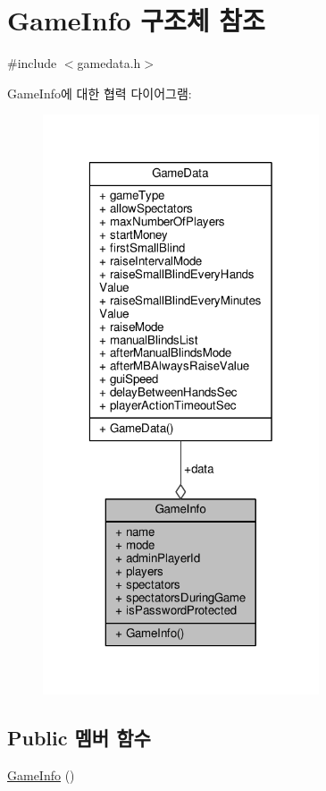 \hypertarget{struct_game_info}{\section{Game\-Info 구조체 참조}
\label{struct_game_info}
}


{\ttfamily \#include $<$gamedata.\-h$>$}



Game\-Info에 대한 협력 다이어그램\-:\nopagebreak
\begin{figure}[H]
\begin{center}
\leavevmode
\includegraphics[width=232pt]{struct_game_info__coll__graph}
\end{center}
\end{figure}
\subsection*{Public 멤버 함수}
\begin{DoxyCompactItemize}
\item 
\hyperlink{struct_game_info_ae7ded63bd69b007847bd66debaeebc23}{Game\-Info} ()
\end{DoxyCompactItemize}
